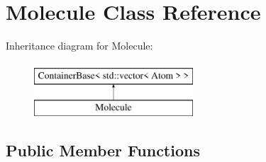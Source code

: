 \hypertarget{classMolecule}{}\section{Molecule Class Reference}
\label{classMolecule}
Inheritance diagram for Molecule\+:\begin{figure}[H]
\begin{center}
\leavevmode
\includegraphics[height=2.000000cm]{classMolecule}
\end{center}
\end{figure}
\subsection*{Public Member Functions}
